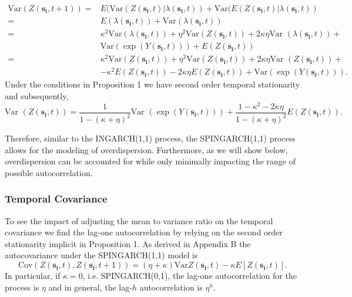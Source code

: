 \documentclass[11pt]{isuthesis}
\begin{document}
\begin{align}
	\mbox{Var}(Z(\boldsymbol{s_i},t+1))  =& E(\mbox{Var}(Z(\boldsymbol{s_i},t)|\lambda(\boldsymbol{s_i},t))+\mbox{Var}(E(Z(\boldsymbol{s_i},t)|\lambda(\boldsymbol{s_i},t))\\
	=& E(\lambda(\boldsymbol{s_i},t))+\mbox{Var}(\lambda(\boldsymbol{s_i},t)) \nonumber\\
	= & \kappa^2 \mbox{Var} (\lambda(\boldsymbol{s_i},t))+\eta^2 \mbox{Var}(Z(\boldsymbol{s_i},t))+2 \kappa \eta \mbox{Var }(\lambda(\boldsymbol{s_i},t))+\nonumber\\
	& \mbox{Var}(\exp(Y(\boldsymbol{s_i},t)))+E(Z(\boldsymbol{s_i},t))\\
	=&\kappa^2 \mbox{Var} (Z(\boldsymbol{s_i},t))+\eta^2 \mbox{Var}(Z(\boldsymbol{s_i},t))+2 \kappa \eta \mbox{Var }(Z(\boldsymbol{s_i},t))+\nonumber \nonumber\\
	& - \kappa^2 E(Z(\boldsymbol{s_i},t))-2 \kappa \eta E(Z(\boldsymbol{s_i},t))+\mbox{Var} (\exp(Y(\boldsymbol{s_i},t))).
\end{align}
Under the conditions in Proposition 1 we have second order temporal stationarity and subsequently,
\begin{equation}
	\mbox{Var }(Z(\boldsymbol{s_i},t))=\frac{1}{1-(\kappa+\eta)^2} \mbox{Var }(\exp(Y(\boldsymbol{s_i},t)))+\frac{1-\kappa^2-2\kappa \eta}{1-(\kappa+\eta)^2}E(Z(\boldsymbol{s_i},t)).
\end{equation}

Therefore, similar to the INGARCH(1,1) process, the SPINGARCH(1,1) process allows for the modeling of overdispersion.  Furthermore, as we will show below, overdispersion can be accounted for while only minimally impacting the range of possible autocorrelation.


\subsubsection{Temporal Covariance}

To see the impact of adjusting the mean to variance ratio on the temporal covariance we find the lag-one autocorrelation by relying on the second order stationarity implicit in Proposition 1.  As derived in Appendix B the autocovariance under the SPINGARCH(1,1) model is
\begin{equation}
	\mbox{Cov}(Z(\boldsymbol{s_i},t),Z(\boldsymbol{s_i},t+1))=\left(\eta+\kappa\right)\mbox{Var} Z(\boldsymbol{s_i},t)-\kappa E[Z(\boldsymbol{s_i},t)] \label{eq:Autocov}.
\end{equation}
In particular, if $\kappa=0$, i.e. SPINGARCH(0,1), the lag-one autocorrelation for the process is $\eta$ and in general, the lag-$h$ autocorrelation is $\eta^h$.  
\end{document}
